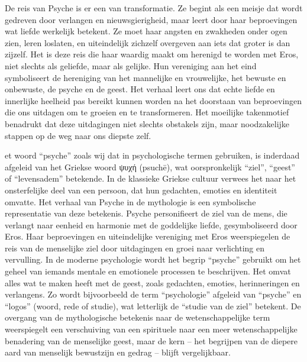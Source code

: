 De reis van Psyche is er een van transformatie. Ze begint als een meisje dat wordt gedreven door verlangen en nieuwsgierigheid, maar leert door haar beproevingen wat liefde werkelijk betekent. Ze moet haar angsten en zwakheden onder ogen zien, leren loslaten, en uiteindelijk zichzelf overgeven aan iets dat groter is dan zijzelf. Het is deze reis die haar waardig maakt om herenigd te worden met Eros, niet slechts als geliefde, maar als gelijke. Hun vereniging aan het eind symboliseert de hereniging van het mannelijke en vrouwelijke, het bewuste en onbewuste, de psyche en de geest.
Het verhaal leert ons dat echte liefde en innerlijke heelheid pas bereikt kunnen worden na het doorstaan van beproevingen die ons uitdagen om te groeien en te transformeren. Het moeilijke takenmotief benadrukt dat deze uitdagingen niet slechts obstakels zijn, maar noodzakelijke stappen op de weg naar ons diepste zelf.

et woord “psyche” zoals wij dat in psychologische termen gebruiken, is inderdaad afgeleid van het Griekse woord ψυχή (psuchē), wat oorspronkelijk “ziel”, “geest” of “levensadem” betekende. In de klassieke Griekse cultuur verwees het naar het onsterfelijke deel van een persoon, dat hun gedachten, emoties en identiteit omvatte.
Het verhaal van Psyche in de mythologie is een symbolische representatie van deze betekenis. Psyche personifieert de ziel van de mens, die verlangt naar eenheid en harmonie met de goddelijke liefde, gesymboliseerd door Eros. Haar beproevingen en uiteindelijke vereniging met Eros weerspiegelen de reis van de menselijke ziel door uitdagingen en groei naar verlichting en vervulling.
In de moderne psychologie wordt het begrip “psyche” gebruikt om het geheel van iemands mentale en emotionele processen te beschrijven. Het omvat alles wat te maken heeft met de geest, zoals gedachten, emoties, herinneringen en verlangens. Zo wordt bijvoorbeeld de term “psychologie” afgeleid van “psyche” en “logos” (woord, rede of studie), wat letterlijk de “studie van de ziel” betekent.
De overgang van de mythologische betekenis naar de wetenschappelijke term weerspiegelt een verschuiving van een spirituele naar een meer wetenschappelijke benadering van de menselijke geest, maar de kern – het begrijpen van de diepere aard van menselijk bewustzijn en gedrag – blijft vergelijkbaar.
